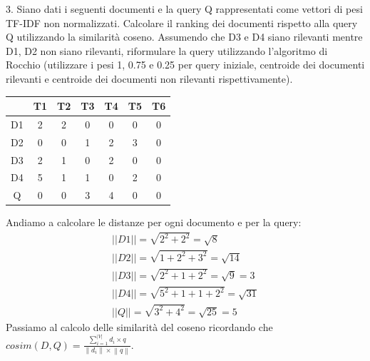 \documentclass{report}
\begin{document}
	

	3. Siano dati i seguenti documenti e la query Q rappresentati come vettori di pesi TF-IDF non normalizzati. Calcolare il ranking dei documenti rispetto alla query Q utilizzando la similarità coseno. Assumendo che D3 e D4 siano rilevanti mentre D1, D2 non siano rilevanti, riformulare la query utilizzando l'algoritmo di Rocchio (utilizzare i pesi 1, 0.75 e 0.25 per query iniziale, centroide dei documenti rilevanti e centroide dei documenti non rilevanti rispettivamente).
	\begin{table}[H]
		\centering
		\begin{tabular}{|c|c|c|c|c|c|c|}
			\hline
			& T1 & T2 & T3 & T4 & T5 & T6 \\ \hline
			D1 & 2 & 2 & 0 & 0 & 0 & 0 \\ \hline
			D2 & 0 & 0 & 1 & 2 & 3 & 0 \\ \hline
			D3 & 2 & 1 & 0 & 2 & 0 & 0 \\ \hline
			D4 & 5 & 1 & 1 & 0 & 2 & 0 \\ \hline
			Q & 0 & 0 & 3 & 4 & 0 & 0 \\ \hline
		\end{tabular}
	\end{table}
	Andiamo a calcolare le distanze per ogni documento e per la query:
	\[
		\begin{array}{l}
			||D1|| = \sqrt{2^2 + 2^2} = \sqrt{8}\\
			||D2|| = \sqrt{1 + 2^2 + 3^2} = \sqrt{14}\\
			||D3|| = \sqrt{2^2 + 1 + 2^2} = \sqrt{9} = 3\\
			||D4|| = \sqrt{5^2 + 1 + 1 + 2^2} = \sqrt{31}\\
			||Q|| = \sqrt{3^2 + 4^2} = \sqrt{25} = 5
		\end{array}
	\]
	Passiamo al calcolo delle similarità del coseno ricordando che $cosim(D,Q) = \frac{\sum_{i=1}^{|V|} d_i \times q}{\left\lVert d_i \right\rVert \times \left\lVert q \right\rVert}$.
\end{document}
